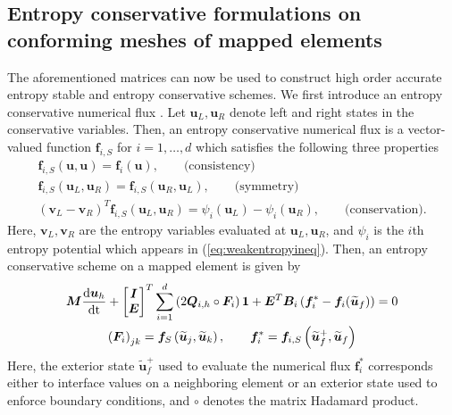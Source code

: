\documentclass{svjour3}                     %
\renewcommand{\tilde}{\widetilde}
\newcommand{\td}[2]{\frac{{\rm d}#1}{{\rm d}{\rm #2}}}
\newcommand{\LRp}[1]{\left( #1 \right)}
\begin{document}
\subsection{Entropy conservative formulations on conforming meshes of mapped elements}

The aforementioned matrices can now be used to construct high order accurate entropy stable and entropy conservative schemes.  We first introduce an entropy conservative numerical flux \cite{tadmor1987numerical}.  Let $\bm{u}_L, \bm{u}_R$ denote left and right states in the conservative variables.  Then, an entropy conservative numerical flux is a vector-valued function $\bm{f}_{i,S}$ for $i = 1,\ldots,d$ which satisfies the following three properties
\begin{gather*}
\bm{f}_{i,S}\LRp{\bm{u},\bm{u}} = \bm{f}_i(\bm{u}), \qquad \text{(consistency)}\\
\bm{f}_{i,S}\LRp{\bm{u}_L,\bm{u}_R} = \bm{f}_{i,S}(\bm{u}_R,\bm{u}_L), \qquad \text{(symmetry)}\\
\LRp{\bm{v}_L-\bm{v}_R}^T\bm{f}_{i,S}\LRp{\bm{u}_L,\bm{u}_R} = \psi_i(\bm{u}_L) - \psi_i(\bm{u}_R), \qquad \text{(conservation)}.
\end{gather*}
Here, $\bm{v}_L, \bm{v}_R$ are the entropy variables evaluated at $\bm{u}_L, \bm{u}_R$, and $\psi_i$ is the $i$th entropy potential which appears in (\ref{eq:weakentropyineq}).  
Then, an entropy conservative scheme on a mapped element is given by
\begin{gather}
{\bm{M}}\td{\bm{u}_h}{t} + \begin{bmatrix} \bm{I} \\ \bm{E} \end{bmatrix}^T
\sum_{i=1}^d \LRp{2{\bm{Q}}_{i,h} \circ \bm{F}_i}\bm{1} + \bm{E}^T{\bm{B}}_i\LRp{\bm{f}_i^*-\bm{f}_i(\tilde{\bm{u}}_f)} = 0 \label{eq:esdg}\\
\LRp{\bm{F}_i}_{jk} = \bm{f}_S\LRp{\tilde{\bm{u}}_j,\tilde{\bm{u}}_k}, \qquad \bm{f}_i^* = \bm{f}_{i,S}\LRp{\tilde{\bm{u}}_f^+,\tilde{\bm{u}}_f} \nonumber
\end{gather}
Here, the exterior state $\tilde{\bm{u}}_f^+$ used to evaluate the numerical flux $\bm{f}_i^*$ corresponds either to interface values on a neighboring element or an exterior state used to enforce boundary conditions, and $\circ$ denotes the matrix Hadamard product.  
\end{document}
